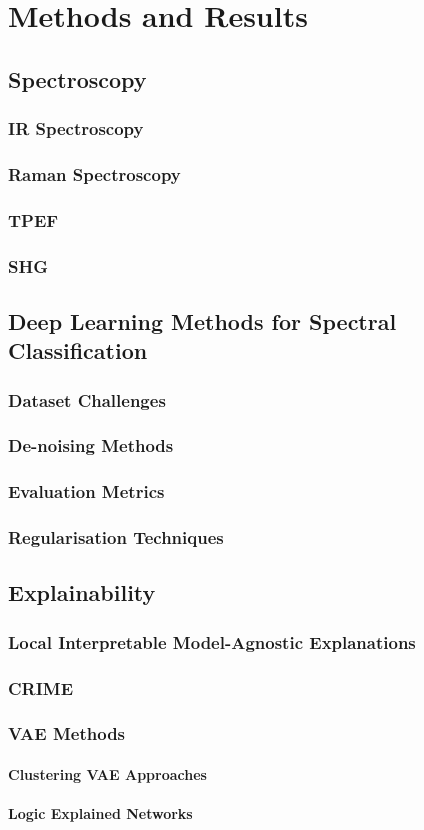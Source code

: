 \section{Methods and Results}
\subsection{Spectroscopy}
\subsubsection{IR Spectroscopy}
\subsubsection{Raman Spectroscopy}
\subsubsection{TPEF}
\subsubsection{SHG}

\subsection{Deep Learning Methods for Spectral Classification}
\subsubsection{Dataset Challenges}
\subsubsection{De-noising Methods}
\subsubsection{Evaluation Metrics}
\subsubsection{Regularisation Techniques}

\subsection{Explainability}
\subsubsection{Local Interpretable Model-Agnostic Explanations}
\subsubsection{CRIME}
\subsubsection{VAE Methods}
\paragraph{Clustering VAE Approaches}
\paragraph{Logic Explained Networks}